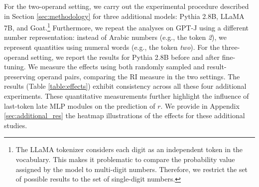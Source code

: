 \documentclass[11pt]{article}
\begin{document}
For the two-operand setting, we carry out the experimental procedure described in Section \ref{sec:methodology} for three additional models: Pythia 2.8B, LLaMA 7B, and Goat.\footnote{The LLaMA tokenizer considers each digit as an independent token in the vocabulary. This makes it problematic to compare the probability value assigned by the model to multi-digit numbers. Therefore, we restrict the set of possible results to the set of single-digit numbers.}
Furthermore, we repeat the analyses on GPT-J using a different number representation: instead of Arabic numbers (e.g., the token \textit{2}), we represent quantities using numeral words (e.g., the token \textit{two}).
For the three-operand setting, we report the results for Pythia 2.8B before and after fine-tuning.
We measure the effects using both randomly sampled and result-preserving operand pairs, comparing the RI measure in the two settings. The results (Table \ref{table:effects}) exhibit consistency across all these four additional experiments. These quantitative measurements further highlight the influence of last-token late MLP modules on the prediction of $r$. We provide in Appendix \ref{sec:additional_res} the heatmap illustrations of the effects for these additional studies. 

\begin{table}\small
    \caption{Relative importance (RI) measurements for the last-token late MLP activation site. The decrease in the RI observed when fixing the result of the two pairs of operands used for the interventions quantitatively confirms the role of this subset of the model in incorporating result-related information.}
    \label{table:effects}
\end{table}
\end{document}
